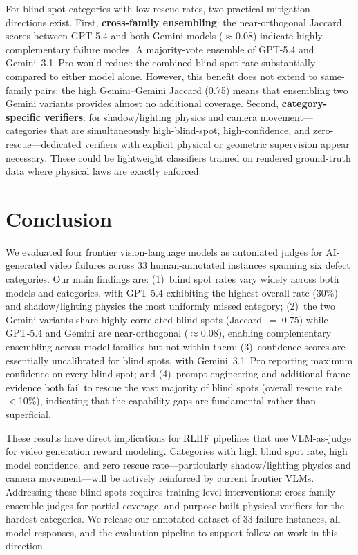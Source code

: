 \documentclass[11pt]{article}
\begin{document}
For blind spot categories with low rescue rates, two practical mitigation directions exist. First, \textbf{cross-family ensembling}: the near-orthogonal Jaccard scores between GPT-5.4 and both Gemini models ($\approx 0.08$) indicate highly complementary failure modes. A majority-vote ensemble of GPT-5.4 and Gemini~3.1~Pro would reduce the combined blind spot rate substantially compared to either model alone. However, this benefit does not extend to same-family pairs: the high Gemini--Gemini Jaccard (0.75) means that ensembling two Gemini variants provides almost no additional coverage. Second, \textbf{category-specific verifiers}: for shadow/lighting physics and camera movement---categories that are simultaneously high-blind-spot, high-confidence, and zero-rescue---dedicated verifiers with explicit physical or geometric supervision appear necessary. These could be lightweight classifiers trained on rendered ground-truth data where physical laws are exactly enforced.

\section{Conclusion}

We evaluated four frontier vision-language models as automated judges for AI-generated video failures across 33 human-annotated instances spanning six defect categories. Our main findings are: (1)~blind spot rates vary widely across both models and categories, with GPT-5.4 exhibiting the highest overall rate (30\%) and shadow/lighting physics the most uniformly missed category; (2)~the two Gemini variants share highly correlated blind spots (Jaccard~$=~0.75$) while GPT-5.4 and Gemini are near-orthogonal ($\approx 0.08$), enabling complementary ensembling across model families but not within them; (3)~confidence scores are essentially uncalibrated for blind spots, with Gemini~3.1~Pro reporting maximum confidence on every blind spot; and (4)~prompt engineering and additional frame evidence both fail to rescue the vast majority of blind spots (overall rescue rate $<$10\%), indicating that the capability gaps are fundamental rather than superficial.

These results have direct implications for RLHF pipelines that use VLM-as-judge for video generation reward modeling. Categories with high blind spot rate, high model confidence, and zero rescue rate---particularly shadow/lighting physics and camera movement---will be actively reinforced by current frontier VLMs. Addressing these blind spots requires training-level interventions: cross-family ensemble judges for partial coverage, and purpose-built physical verifiers for the hardest categories. We release our annotated dataset of 33 failure instances, all model responses, and the evaluation pipeline to support follow-on work in this direction.
\end{document}
